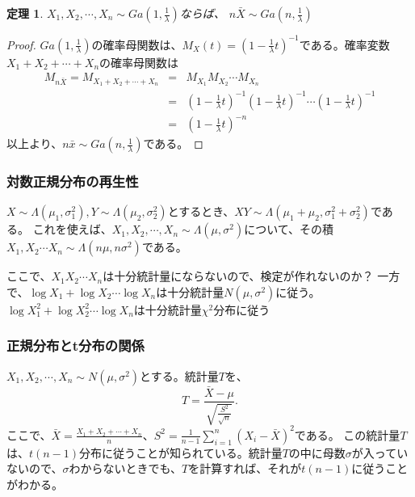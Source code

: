 \documentclass[a4paper,11pt,dvipdfmx]{jsarticle}
\newtheorem{theo}{定理}[section]
\begin{document}
\begin{theo}
    $X_1,X_2,\cdots,X_n \sim Ga(1,\frac{1}{\lambda})$ならば、
    $n\bar{X}\sim Ga(n,\frac{1}{\lambda})$
\end{theo}

\begin{proof}
    $Ga(1,\frac{1}{\lambda})$の確率母関数は、$M_X(t)=(1-\frac{1}{\lambda}t)^{-1}$である。確率変数$X_1+X_2+\cdots+X_n$の確率母関数は
    \begin{eqnarray}
        M_{n\bar{X}} = M_{X_1+X_2+\cdots+X_n} &=& M_{X_1}M_{X_2}\cdots M_{X_n} \\
        &=& (1-\frac{1}{\lambda}t)^{-1}(1-\frac{1}{\lambda}t)^{-1}\cdots(1-\frac{1}{\lambda}t)^{-1}\\
        &=& (1-\frac{1}{\lambda}t)^{-n}
    \end{eqnarray}
    以上より、$n\bar{x}\sim Ga(n,\frac{1}{\lambda})$である。
\end{proof}

\subsubsection{対数正規分布の再生性}
$X\sim \Lambda(\mu_1,\sigma_1^2), Y\sim \Lambda(\mu_2,\sigma^2_2)$とするとき、$XY\sim\Lambda(\mu_1+\mu_2,\sigma_1^2+\sigma_2^2)$である。
これを使えば、$X_1,X_2,\cdots,X_n \sim \Lambda(\mu,\sigma^2)$について、その積$X_1,X_2\cdots X_n \sim \Lambda(n\mu,n\sigma^2)$である。

ここで、$X_1X_2\cdots X_n$は十分統計量にならないので、検定が作れないのか？
一方で、$\log X_1+\log X_2 \cdots \log X_n $は十分統計量$N(\mu,\sigma^2)$に従う。
$\log X_1^2+\log X_2^2 \cdots \log X_n $は十分統計量$\chi^2$分布に従う
\fi

\subsubsection{正規分布とt分布の関係}
$X_1,X_2,\cdots,X_n \sim N(\mu,\sigma^2)$とする。統計量$T$を、
\begin{equation*}
    T = \frac{\bar{X}-\mu}{\sqrt{\frac{S^2}{\sqrt{n}}}}.
\end{equation*}
ここで、$\bar{X}=\frac{X_1+X_2+\cdots+X_n}{n}$、$S^2=\frac{1}{n-1}\sum_{i=1}^{n}(X_i-\bar{X})^2$である。
この統計量$T$は、$t(n-1)$分布に従うことが知られている。統計量$T$の中に母数$\sigma$が入っていないので、$\sigma$わからないときでも、$T$を計算すれば、それが$t(n-1)$に従うことがわかる。
\end{document}
